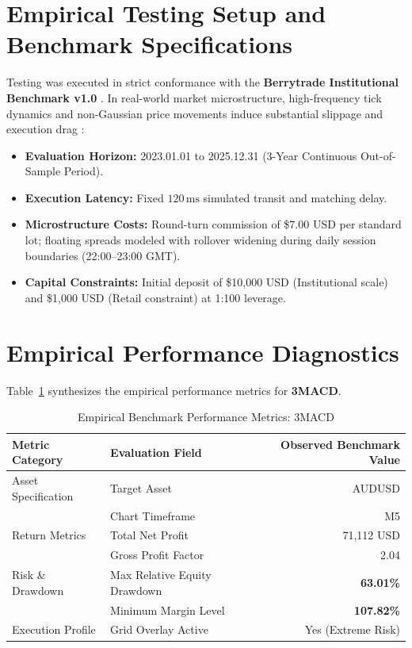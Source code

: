 \documentclass[11pt,a4paper]{article}
\begin{document}
\section{Empirical Testing Setup and Benchmark Specifications}
Testing was executed in strict conformance with the \textbf{Berrytrade Institutional Benchmark v1.0} \cite{artsu2026illusion}. In real-world market microstructure, high-frequency tick dynamics and non-Gaussian price movements induce substantial slippage and execution drag \cite{kyle1985continuous, amihud2002illiquidity, cont2001empirical, mandelbrot1963variation}:
\begin{itemize}
    \item \textbf{Evaluation Horizon:} 2023.01.01 to 2025.12.31 (3-Year Continuous Out-of-Sample Period).
    \item \textbf{Execution Latency:} Fixed $120\,\text{ms}$ simulated transit and matching delay.
    \item \textbf{Microstructure Costs:} Round-turn commission of \$7.00 USD per standard lot; floating spreads modeled with rollover widening during daily session boundaries (22:00--23:00 GMT).
    \item \textbf{Capital Constraints:} Initial deposit of \$10,000 USD (Institutional scale) and \$1,000 USD (Retail constraint) at 1:100 leverage.
\end{itemize}

\section{Empirical Performance Diagnostics}
Table~\ref{tab:metrics} synthesizes the empirical performance metrics for \textbf{3MACD}.

\begin{table}[H]
\centering
\caption{Empirical Benchmark Performance Metrics: 3MACD}
\label{tab:metrics}
\begin{tabular}{llr}
\toprule
\textbf{Metric Category} & \textbf{Evaluation Field} & \textbf{Observed Benchmark Value} \\
\midrule
Asset Specification & Target Asset & AUDUSD \\
& Chart Timeframe & M5 \\
Return Metrics & Total Net Profit & 71,112 USD \\
& Gross Profit Factor & 2.04 \\
Risk \& Drawdown & Max Relative Equity Drawdown & \textbf{63.01\%} \\
& Minimum Margin Level & \textbf{107.82\%} \\
Execution Profile & Grid Overlay Active & Yes (Extreme Risk) \\
\bottomrule
\end{tabular}
\end{table}
\end{document}
